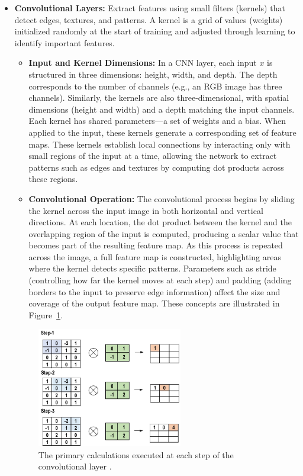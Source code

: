 \begin{itemize}
    \item \textbf{Convolutional Layers:} Extract features using small filters (kernels) that detect edges, textures, and patterns. A kernel is a grid of values (weights) initialized randomly at the start of training and adjusted through learning to identify important features.
     
     \begin{itemize}
        \item \textbf{Input and Kernel Dimensions:} In a CNN layer, each input $x$ is structured in three dimensions: height, width, and depth. The depth corresponds to the number of channels (e.g., an RGB image has three channels). Similarly, the kernels are also three-dimensional, with spatial dimensions (height and width) and a depth matching the input channels. Each kernel has shared parameters---a set of weights and a bias. When applied to the input, these kernels generate a corresponding set of feature maps. These kernels establish local connections by interacting only with small regions of the input at a time, allowing the network to extract patterns such as edges and textures by computing dot products across these regions.
        \item \textbf{Convolutional Operation:} The convolutional process begins by sliding the kernel across the input image in both horizontal and vertical directions. At each location, the dot product between the kernel and the overlapping region of the input is computed, producing a scalar value that becomes part of the resulting feature map. As this process is repeated across the image, a full feature map is constructed, highlighting areas where the kernel detects specific patterns. Parameters such as stride (controlling how far the kernel moves at each step) and padding (adding borders to the input to preserve edge information) affect the size and coverage of the output feature map. These concepts are illustrated in Figure~\ref{fig:figure05}.
     \end{itemize}   
    
    
    \begin{figure}[H] %
        \centering
        \includegraphics[width=0.6\textwidth]{chapters/chapter1/images/Figure05.png}
        \caption{The primary calculations executed at each step of the convolutional layer \parencite{alzubaidi2021review}.}
        \label{fig:figure05}
    \end{figure}


\end{itemize}
